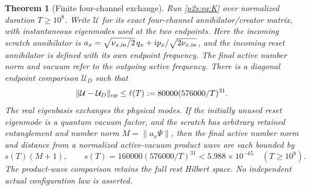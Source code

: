 \documentclass[11pt]{article}
\numberwithin{equation}{section}
\newtheorem{theorem}{Theorem}[section]
\theoremstyle{definition}
\theoremstyle{remark}
\begin{document}
\begin{theorem}[Finite four-channel exchange]
\label{p2s:thm:gain}
Run \eqref{p2s:eq:K} over normalized duration $T\geq10^8$.
Write $\mathcal U$ for its exact four-channel annihilator/creator matrix,
with instantaneous eigenmodes used at the two endpoints. Here the incoming
scratch annihilator is $a_x=\sqrt{\nu_{x,\rm in}/2}\,q_x+
i p_x/\sqrt{2\nu_{x,\rm in}}$, and the incoming reset annihilator is
defined with its own endpoint frequency. The final active number norm
and vacuum refer to the outgoing active frequency. There is a
diagonal endpoint comparison $\mathcal U_D$ such that
\begin{equation}\label{p2s:eq:gain-bound}
 \|\mathcal U-\mathcal U_D\|_{\rm op}
 \leq\ell(T):=80000(576000/T)^{31}.
\end{equation}
The real eigenbasis exchanges the physical modes. If the initially unused
reset eigenmode is a quantum vacuum factor, and the scratch has arbitrary
retained entanglement and number norm $M=\|a_x\Psi\|$, then the final active
number norm and distance from a normalized active-vacuum product wave
are each bounded by
\begin{equation}\label{p2s:eq:gain-state}
 s(T)(M+1),\qquad s(T)=160000(576000/T)^{31}
 <5.988\times10^{-65}\quad(T\geq10^8).
\end{equation}
The product-wave comparison retains the full rest Hilbert space. No
independent actual configuration law is asserted.
\end{theorem}
\end{document}
